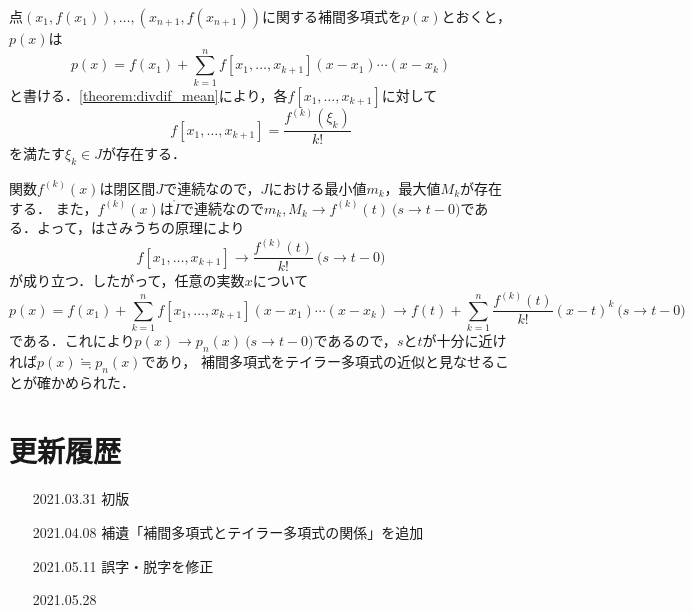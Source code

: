 \documentclass[a4paper]{ltjsarticle}
\theoremstyle{definition}
\newcommand{\plimas}[1]{\pod{#1}}
\begin{document}
点$(x_1,f(x_1)),\dots,(x_{n+1},f(x_{n+1}))$に関する補間多項式を$p(x)$とおくと，$p(x)$は
\[
  p(x) = f(x_1) + \sum_{k=1}^n f[x_1,\dots,x_{k+1}] (x-x_1) \dotsm (x-x_k)
\]
と書ける．\cref{theorem:divdif_mean}により，各$f[x_1,\dots,x_{k+1}]$に対して
\[
  f[x_1,\dots,x_{k+1}] = \frac{f^{(k)}(\xi_k)}{k!}
\]
を満たす$\xi_k\in J$が存在する．

関数$f^{(k)}(x)$は閉区間$J$で連続なので，$J$における最小値$m_k$，最大値$M_k$が存在する．
また，$f^{(k)}(x)$は$\mathring{I}$で連続なので$m_k, M_k\to f^{(k)}(t)\plimas{s\to t-0}$である．よって，はさみうちの原理により
\[
  f[x_1,\dots,x_{k+1}] \to \frac{f^{(k)}(t)}{k!}\plimas{s\to t-0}
\]
が成り立つ．したがって，任意の実数$x$について
\[
  p(x)=f(x_1)+\sum_{k=1}^n f[x_1,\dots,x_{k+1}](x-x_1)\dotsm (x-x_k)\to f(t)+ \sum_{k=1}^n \frac{f^{(k)}(t)}{k!} (x-t)^k \plimas{s\to t-0}
\]
である．これにより$p(x)\to p_n(x)\plimas{s\to t-0}$であるので，$s$と$t$が十分に近ければ$p(x)\fallingdotseq p_n(x)$であり，
補間多項式をテイラー多項式の近似と見なせることが確かめられた．


\nocite{*}


\section*{更新履歴}
\begin{enumerate}[align=left]
  \item[2021.03.31] 初版
  \item[2021.04.08] 補遺「補間多項式とテイラー多項式の関係」を追加
  \item[2021.05.11] 誤字・脱字を修正
  \item[2021.05.28]  
\end{enumerate}
\end{document}
